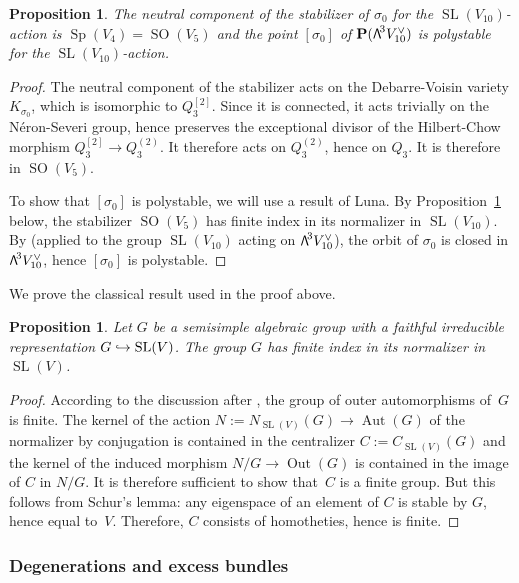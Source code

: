 \documentclass[11pt]{article}
\newcommand\hto{\mathrel{\lhook\joinrel\to}}
\newtheorem{prop}[lemm]{Proposition}
\theoremstyle{definition}
\renewcommand\P{{\mathbf P}}\let\PP\P
\DeclareMathOperator{\Aut}{Aut}
\DeclareMathOperator{\Out}{Out}
\DeclareMathOperator{\SO}{SO}
\DeclareMathOperator{\Sp}{Sp}
\DeclareMathOperator{\SL}{SL}
\newcommand\bw[1]{{\hbox{\large$\mathsf{\Lambda}$}^{\!#1}}}
\newcommand\Qtrois{{Q_3}}
\newcommand\hilb{{Q_3^{[2]}}}
\newcommand\chow{{Q_3^{(2)}}}
\begin{document}
\begin{prop}\label{coronouveau}
The neutral component of the stabilizer of $\sigma_0$ for the $\SL(V_{10})$-action is $\Sp(V_4)=\SO(V_5)$ and the point $[\sigma_0]$ of $\P(\bw3V_{10}^\vee)$ is polystable for the $\SL(V_{10})$-action.
\end{prop}

\begin{proof}
The neutral component of the stabilizer acts on the Debarre-Voisin variety $K_{\sigma_0}$, which is isomorphic to $\hilb$. Since it is connected, it acts trivially on the Néron-Severi group, hence preserves the exceptional divisor of the Hilbert-Chow morphism $\hilb\to \chow$. It therefore acts on $\chow$, hence on $\Qtrois$. It is therefore in $\SO(V_5)$.

To show that $[\sigma_0]$ is polystable, we will use a result of Luna. By Proposition~\ref{normal} below, the stabilizer $\SO(V_5)$ has finite index in its normalizer in
$\SL(V_{10})$. By
\cite[Cor.\,3]{luna} (applied to the group $ \SL(V_{10})$ acting on $\bw3V_{10}^\vee $), the orbit of $\sigma_0$ is closed in $\bw3V_{10}^\vee $, hence $[\sigma_0]$ is polystable.
\end{proof}

We prove the classical result used in the proof above.

\begin{prop}\label{normal}
Let $G$ be a semisimple algebraic group with a faithful irreducible representation $G\hto \SL(V)$. The group $G$ has finite index in its normalizer in $\SL(V)$.
\end{prop}

\begin{proof}
According to the discussion after \cite[Lem.\,16.3.8]{spring}, the group of outer automorphisms of~$G$ is finite. The kernel of the action $N:=N_{\SL(V)}(G)\to \Aut(G)$ of the normalizer by conjugation is contained in the centralizer $C:=C_{\SL(V)}(G)$ and the kernel of the induced morphism \mbox{$N/G\to \Out(G)$} is contained in the image of $C$ in $N/G$. It is therefore sufficient to show that~$C$ is a finite group. But this follows from Schur's lemma: any eigenspace of an element of $C$ is stable by $G$, hence equal to~$V$. Therefore, $C$ consists of homotheties, hence is finite.
\end{proof}

\subsubsection{Degenerations and excess bundles}\label{seconepartohivert}
\end{document}
